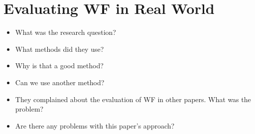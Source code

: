\section{Evaluating WF in Real World}

\begin{frame}
  \begin{question}
    \begin{itemize}
      \item What was the research question?
      \item What methods did they use?
      \item Why is that a good method?
      \item Can we use another method?
    \end{itemize}
  \end{question}
\end{frame}

\begin{frame}
  \begin{question}
    \begin{itemize}
      \item They complained about the evaluation of WF in other papers.
        What was the problem?
      \item Are there any problems with this paper's approach?
    \end{itemize}
  \end{question}
\end{frame}

